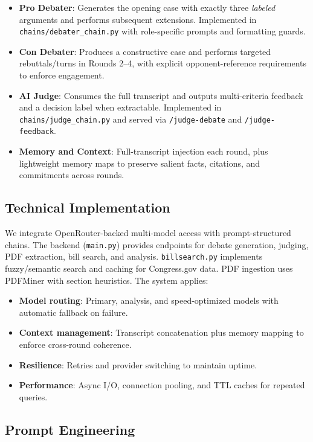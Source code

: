 \documentclass{article}
\begin{document}
\begin{itemize}
    \item \textbf{Pro Debater}: Generates the opening case with exactly three \emph{labeled} arguments and performs subsequent extensions. Implemented in \texttt{chains/debater\_chain.py} with role-specific prompts and formatting guards.
    \item \textbf{Con Debater}: Produces a constructive case and performs targeted rebuttals/turns in Rounds 2--4, with explicit opponent-reference requirements to enforce engagement.
    \item \textbf{AI Judge}: Consumes the full transcript and outputs multi-criteria feedback and a decision label when extractable. Implemented in \texttt{chains/judge\_chain.py} and served via \texttt{/judge-debate} and \texttt{/judge-feedback}.
    \item \textbf{Memory and Context}: Full-transcript injection each round, plus lightweight memory maps to preserve salient facts, citations, and commitments across rounds.
\end{itemize}

\subsection{Technical Implementation}

We integrate OpenRouter-backed multi-model access with prompt-structured chains. The backend (\texttt{main.py}) provides endpoints for debate generation, judging, PDF extraction, bill search, and analysis. \texttt{billsearch.py} implements fuzzy/semantic search and caching for Congress.gov data. PDF ingestion uses PDFMiner with section heuristics. The system applies:

\begin{itemize}
    \item \textbf{Model routing}: Primary, analysis, and speed-optimized models with automatic fallback on failure.
    \item \textbf{Context management}: Transcript concatenation plus memory mapping to enforce cross-round coherence.
    \item \textbf{Resilience}: Retries and provider switching to maintain uptime.
    \item \textbf{Performance}: Async I/O, connection pooling, and TTL caches for repeated queries.
\end{itemize}

\subsection{Prompt Engineering}
\end{document}
